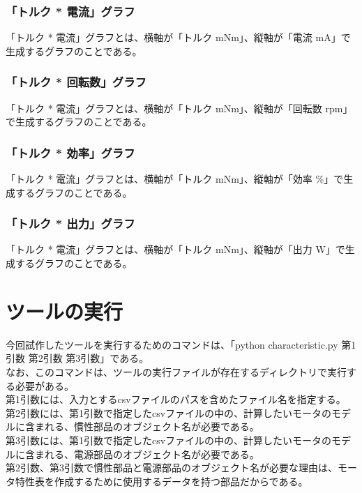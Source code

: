 \subsubsection{「トルク * 電流」グラフ}\label{sub:sub:torden}
「トルク * 電流」グラフとは、横軸が「トルク mNm」、縦軸が「電流 mA」で生成するグラフのことである。
\subsubsection{「トルク * 回転数」グラフ}\label{sub:sub:torkaiten}
「トルク * 電流」グラフとは、横軸が「トルク mNm」、縦軸が「回転数 rpm」で生成するグラフのことである。
\subsubsection{「トルク * 効率」グラフ}\label{sub:sub:torkouritu}
「トルク * 電流」グラフとは、横軸が「トルク mNm」、縦軸が「効率 \%」で生成するグラフのことである。
\subsubsection{「トルク * 出力」グラフ}\label{sub:sub:torsyutu}
「トルク * 電流」グラフとは、横軸が「トルク mNm」、縦軸が「出力 W」で生成するグラフのことである。
\section{ツールの実行}\label{zikkou}
今回試作したツールを実行するためのコマンドは、「python characteristic.py 第1引数 第2引数 第3引数」である。\\
なお、このコマンドは、ツールの実行ファイルが存在するディレクトリで実行する必要がある。\\
第1引数には、入力とするcsvファイルのパスを含めたファイル名を指定する。\\
第2引数には、第1引数で指定したcsvファイルの中の、計算したいモータのモデルに含まれる、慣性部品のオブジェクト名が必要である。\\
第3引数には、第1引数で指定したcsvファイルの中の、計算したいモータのモデルに含まれる、電源部品のオブジェクト名が必要である。\\
第2引数、第3引数で慣性部品と電源部品のオブジェクト名が必要な理由は、モータ特性表を作成するために使用するデータを持つ部品だからである。

